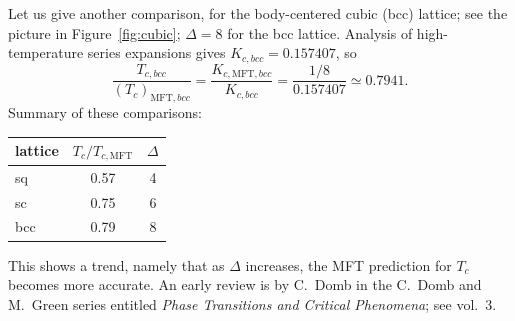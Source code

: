 Let us give another comparison, for the body-centered cubic (bcc) lattice; see the picture in
Figure~\ref{fig:cubic}; $\Delta = 8$ for the bcc lattice. Analysis of high-temperature series
expansions gives $K_{c,bcc} = 0.157407$, so
\begin{equation}
  \frac{T_{c,bcc}}{(T_c)_{\text{MFT},bcc}} = \frac{K_{c,\text{MFT},bcc}}{K_{c,bcc}} = \frac{1/8}{0.157407}\simeq 0.7941 .
\end{equation}
Summary of these comparisons:
\begin{center}
\begin{tabular}{lcc}
  lattice & $T_c/T_{c,\text{MFT}}$ & $\Delta$\\ \hline
  sq & 0.57 & 4\\
  sc & 0.75 & 6\\
  bcc & 0.79 & 8
\end{tabular}
\end{center}
This shows a trend, namely that as $\Delta$ increases, the MFT prediction for $T_c$ becomes more
accurate. An early review is by C.~Domb in the C.~Domb and M.~Green series entitled \emph{Phase
Transitions and Critical Phenomena}; see vol.~3.
